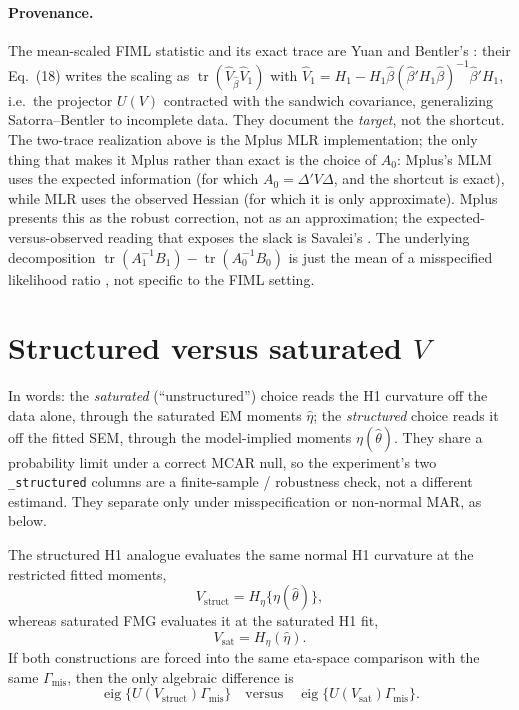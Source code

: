 \documentclass[11pt]{article}
\newcommand{\tr}{\operatorname{tr}}
\newcommand{\eig}{\operatorname{eig}}
\begin{document}
\paragraph{Provenance.} The mean-scaled FIML statistic and its exact trace are
Yuan and Bentler's \cite{yuanbentler2000}: their Eq.~(18) writes the scaling as
\(\tr(\hat V_{\hat\beta}\hat V_1)\) with \(\hat V_1 = H_1 - H_1\hat\beta
(\hat\beta'H_1\hat\beta)^{-1}\hat\beta'H_1\), i.e.\ the projector \(U(V)\)
contracted with the sandwich covariance, generalizing Satorra--Bentler
\cite{satorrabentler1994} to incomplete data. They document the \emph{target},
not the shortcut. The two-trace realization above is the Mplus MLR
implementation; the only thing that makes it Mplus rather than exact is the
choice of \(A_0\): Mplus's MLM uses the expected information (for which
\(A_0=\Delta'V\Delta\), and the shortcut is exact), while MLR uses the observed
Hessian (for which it is only approximate). Mplus presents this as the robust
correction, not as an approximation; the expected-versus-observed reading that
exposes the slack is Savalei's \cite{savalei2010}. The underlying decomposition
\(\tr(A_1^{-1}B_1)-\tr(A_0^{-1}B_0)\) is just the mean of a misspecified
likelihood ratio \cite{white1982}, not specific to the FIML setting.

\section*{Structured versus saturated \(V\)}

In words: the \emph{saturated} (``unstructured'') choice reads the H1 curvature
off the data alone, through the saturated EM moments \(\hat\eta\); the
\emph{structured} choice reads it off the fitted SEM, through the
model-implied moments \(\eta(\hat\theta)\). They share a probability limit
under a correct MCAR null, so the experiment's two \texttt{\_structured}
columns are a finite-sample / robustness check, not a different estimand. They
separate only under misspecification or non-normal MAR, as below.

The structured H1 analogue evaluates the same normal H1 curvature at the
restricted fitted moments,
\[
  V_{\mathrm{struct}}
    =
  H_\eta\{\eta(\hat\theta)\},
\]
whereas saturated FMG evaluates it at the saturated H1 fit,
\[
  V_{\mathrm{sat}}
    =
  H_\eta(\hat\eta).
\]
If both constructions are forced into the same eta-space comparison with the
same \(\Gamma_{\mathrm{mis}}\), then the only algebraic difference is
\[
  \eig\{U(V_{\mathrm{struct}})\Gamma_{\mathrm{mis}}\}
  \quad\text{versus}\quad
  \eig\{U(V_{\mathrm{sat}})\Gamma_{\mathrm{mis}}\}.
\]
\end{document}
